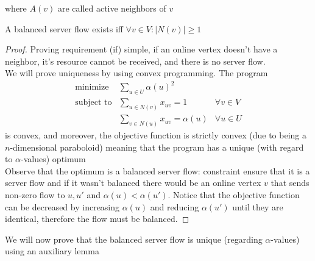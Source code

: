 where $A(v)$ are called active neighbors of $v$

\begin{lemma}
	\label{balanced-sf-iff}
	A balanced server flow exists iff $\forall v\in V: |N(v)|\geq 1$
\end{lemma}
\begin{proof}
	Proving requirement (if) simple, if an online vertex doesn't have a neighbor, it's resource cannot be received, and there is no server flow.\\
	We will prove uniqueness by using convex programming. The program
	\begin{align*}
		\text{minimize} & \sum\limits_{u\in U}\alpha(u)^2\\
		\text{subject to} & \sum\limits_{u\in N(v)}x_{uv}=1 & \forall v\in V\\
		& \sum\limits_{v\in N(u)}x_{uv}=\alpha(u) & \forall u\in U
	\end{align*}
	is convex, and moreover, the objective function is strictly convex (due to being a $n$-dimensional paraboloid) meaning that the program has a unique (with regard to $\alpha$-values) optimum\\
	Observe that the optimum is a balanced server flow: constraint ensure that it is a server flow and if it wasn't balanced there would be an online vertex $v$ that sends non-zero flow to $u,u'$ and $\alpha(u)<\alpha(u')$. Notice that the objective function can be decreased by increasing $\alpha(u)$ and reducing $\alpha(u')$ until they are identical, therefore the flow must be balanced.
\end{proof}

We will now prove that the balanced server flow is unique (regarding $\alpha$-values) using an auxiliary lemma

